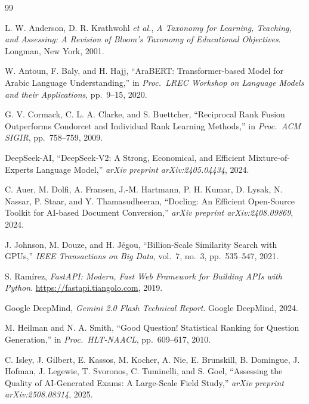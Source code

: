 \documentclass[12pt, a4paper]{article}
\begin{document}
\newpage
\begin{thebibliography}{99}

  L. W. Anderson, D. R. Krathwohl \textit{et al.},
  \textit{A Taxonomy for Learning, Teaching, and Assessing:
  A Revision of Bloom's Taxonomy of Educational Objectives}.
  Longman, New York, 2001.

  W. Antoun, F. Baly, and H. Hajj,
  ``AraBERT: Transformer-based Model for Arabic Language Understanding,''
  in \textit{Proc.\ LREC Workshop on Language Models and their Applications},
  pp.~9--15, 2020.

  G. V. Cormack, C. L. A. Clarke, and S. Buettcher,
  ``Reciprocal Rank Fusion Outperforms Condorcet and Individual Rank Learning Methods,''
  in \textit{Proc.\ ACM SIGIR}, pp.~758--759, 2009.

  DeepSeek-AI,
  ``DeepSeek-V2: A Strong, Economical, and Efficient Mixture-of-Experts Language Model,''
  \textit{arXiv preprint arXiv:2405.04434}, 2024.

  C. Auer, M. Dolfi, A. Fransen, J.-M. Hartmann, P. H. Kumar, D. Lysak,
  N. Nassar, P. Staar, and Y. Thamasudheeran,
  ``Docling: An Efficient Open-Source Toolkit for AI-based Document Conversion,''
  \textit{arXiv preprint arXiv:2408.09869}, 2024.

  J. Johnson, M. Douze, and H. J\'egou,
  ``Billion-Scale Similarity Search with GPUs,''
  \textit{IEEE Transactions on Big Data}, vol.~7, no.~3, pp.~535--547, 2021.

  S. Ram\'irez,
  \textit{FastAPI: Modern, Fast Web Framework for Building APIs with Python}.
  \url{https://fastapi.tiangolo.com}, 2019.

  Google DeepMind,
  \textit{Gemini 2.0 Flash Technical Report}.
  Google DeepMind, 2024.

  M. Heilman and N. A. Smith,
  ``Good Question! Statistical Ranking for Question Generation,''
  in \textit{Proc.\ HLT-NAACL}, pp.~609--617, 2010.

  C. Isley, J. Gilbert, E. Kassos, M. Kocher, A. Nie, E. Brunskill, B. Domingue,
  J. Hofman, J. Legewie, T. Svoronos, C. Tuminelli, and S. Goel,
  ``Assessing the Quality of AI-Generated Exams: A Large-Scale Field Study,''
  \textit{arXiv preprint arXiv:2508.08314}, 2025.


\end{thebibliography}
\end{document}
